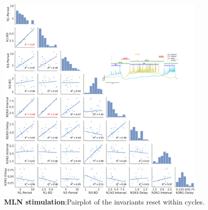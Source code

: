 \begin{figure}[htbp]
	\centering
	\includegraphics[width=0.9\textwidth]{./img/invariants/data/SUSSEX/MLN_driven/images/panel_with_pairplot.pdf}
	\caption{\textbf{MLN stimulation}:Pairplot of the invariants reset within cycles.}
	\label{fig:mln stimulation pairplot}
\end{figure}


